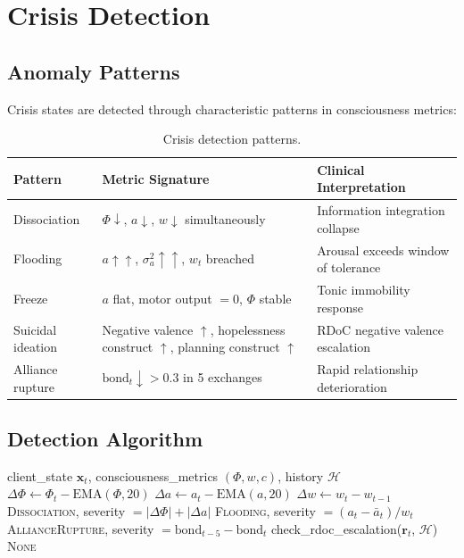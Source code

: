 \documentclass[11pt,a4paper]{article}
\begin{document}
\section{Crisis Detection}

\subsection{Anomaly Patterns}

Crisis states are detected through characteristic patterns in consciousness metrics:

\begin{table}[h]
\centering
\caption{Crisis detection patterns.}
\label{tab:crisis}
\begin{tabular}{@{}lp{4cm}p{5cm}@{}}
\toprule
Pattern & Metric Signature & Clinical Interpretation \\
\midrule
Dissociation & $\Phi \downarrow$, $a \downarrow$, $w \downarrow$ simultaneously & Information integration collapse \\
Flooding & $a \uparrow\uparrow$, $\sigma^2_a \uparrow\uparrow$, $w_t$ breached & Arousal exceeds window of tolerance \\
Freeze & $a$ flat, motor output $= 0$, $\Phi$ stable & Tonic immobility response \\
Suicidal ideation & Negative valence $\uparrow$, hopelessness construct $\uparrow$, planning construct $\uparrow$ & RDoC negative valence escalation \\
Alliance rupture & $\text{bond}_t \downarrow > 0.3$ in 5 exchanges & Rapid relationship deterioration \\
\bottomrule
\end{tabular}
\end{table}

\subsection{Detection Algorithm}

\begin{algorithm}[h]
\caption{Crisis Detection}
\label{alg:crisis}
\begin{algorithmic}[1]
\REQUIRE client\_state $\mathbf{x}_t$, consciousness\_metrics $(\Phi, w, c)$, history $\mathcal{H}$
\STATE $\Delta\Phi \leftarrow \Phi_t - \text{EMA}(\Phi, 20)$
\STATE $\Delta a \leftarrow a_t - \text{EMA}(a, 20)$
\STATE $\Delta w \leftarrow w_t - w_{t-1}$
    \RETURN \textsc{Dissociation}, severity $= |\Delta\Phi| + |\Delta a|$
    \RETURN \textsc{Flooding}, severity $= (a_t - \bar{a}_t) / w_t$
    \RETURN \textsc{AllianceRupture}, severity $= \text{bond}_{t-5} - \text{bond}_t$
\ENDIF
\STATE check\_rdoc\_escalation($\mathbf{r}_t$, $\mathcal{H}$)
\RETURN \textsc{None}
\end{algorithmic}
\end{algorithm}
\end{document}
